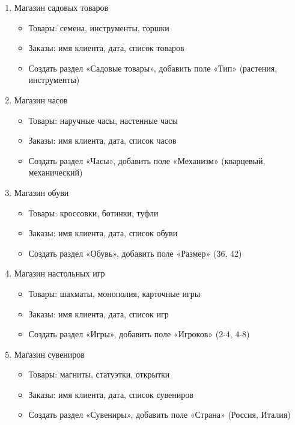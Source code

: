 \documentclass[12pt]{article}
\begin{document}
\begin{enumerate}
	\item Магазин садовых товаров
	      \begin{itemize}
		      \item Товары: семена, инструменты, горшки
		      \item Заказы: имя клиента, дата, список товаров
		      \item Создать раздел «Садовые товары», добавить поле «Тип» (растения, инструменты)
	      \end{itemize}

	\item Магазин часов
	      \begin{itemize}
		      \item Товары: наручные часы, настенные часы
		      \item Заказы: имя клиента, дата, список часов
		      \item Создать раздел «Часы», добавить поле «Механизм» (кварцевый, механический)
	      \end{itemize}

	\item Магазин обуви
	      \begin{itemize}
		      \item Товары: кроссовки, ботинки, туфли
		      \item Заказы: имя клиента, дата, список обуви
		      \item Создать раздел «Обувь», добавить поле «Размер» (36, 42)
	      \end{itemize}

	\item Магазин настольных игр
	      \begin{itemize}
		      \item Товары: шахматы, монополия, карточные игры
		      \item Заказы: имя клиента, дата, список игр
		      \item Создать раздел «Игры», добавить поле «Игроков» (2-4, 4-8)
	      \end{itemize}

	\item Магазин сувениров
	      \begin{itemize}
		      \item Товары: магниты, статуэтки, открытки
		      \item Заказы: имя клиента, дата, список сувениров
		      \item Создать раздел «Сувениры», добавить поле «Страна» (Россия, Италия)
	      \end{itemize}


\end{enumerate}
\end{document}
